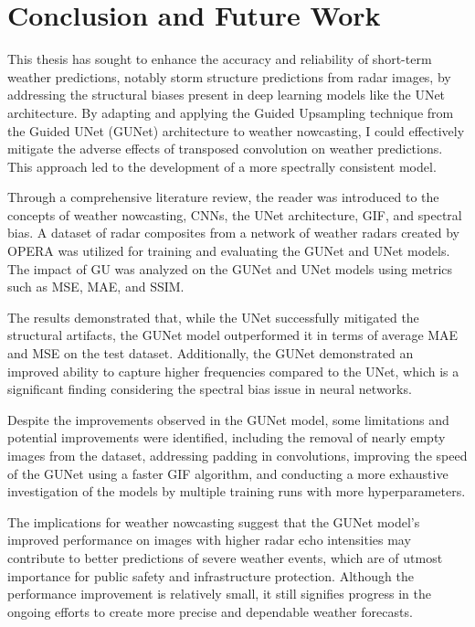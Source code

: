 \chapter{Conclusion and Future Work}
\label{chap:conclusion}

This thesis has sought to enhance the accuracy and reliability of short-term weather predictions, notably storm structure predictions from radar images, by addressing the structural biases present in deep learning models like the UNet architecture. By adapting and applying the Guided Upsampling technique from the Guided UNet (GUNet) architecture to weather nowcasting, I could effectively mitigate the adverse effects of transposed convolution on weather predictions. This approach led to the development of a more spectrally consistent model.

Through a comprehensive literature review, the reader was introduced to the concepts of weather nowcasting, \glspl{CNN}, the UNet architecture, \gls{GIF}, and spectral bias. A dataset of radar composites from a network of weather radars created by \gls{OPERA} was utilized for training and evaluating the \gls{GUNet} and UNet models. The impact of \gls{GU} was analyzed on the \gls{GUNet} and UNet models using metrics such as \gls{MSE}, \gls{MAE}, and \gls{SSIM}.

The results demonstrated that, while the UNet successfully mitigated the structural artifacts, the \gls{GUNet} model outperformed it in terms of average \gls{MAE} and \gls{MSE} on the test dataset. Additionally, the \gls{GUNet} demonstrated an improved ability to capture higher frequencies compared to the UNet, which is a significant finding considering the spectral bias issue in neural networks.

Despite the improvements observed in the \gls{GUNet} model, some limitations and potential improvements were identified, including the removal of nearly empty images from the dataset, addressing padding in convolutions, improving the speed of the \gls{GUNet} using a faster \gls{GIF} algorithm, and conducting a more exhaustive investigation of the models by multiple training runs with more hyperparameters.

The implications for weather nowcasting suggest that the \gls{GUNet} model's improved performance on images with higher radar echo intensities may contribute to better predictions of severe weather events, which are of utmost importance for public safety and infrastructure protection. Although the performance improvement is relatively small, it still signifies progress in the ongoing efforts to create more precise and dependable weather forecasts.

